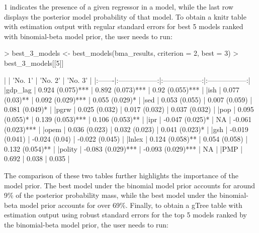 \documentclass[a4paper]{article}
\begin{document}
1 indicates the presence of a given regressor in a model, while the last row displays the posterior model probability of that model. To obtain a knitr table with estimation output with regular standard errors for best 5 models ranked with binomial-beta model prior, the user needs to run:
\begin{Schunk}
\begin{Sinput}
> best_3_models <- best_models(bma_results, criterion = 2, best = 3)
> best_3_models[[5]]
\end{Sinput}
\begin{Soutput}
|        |      'No. 1'      |      'No. 2'      |      'No. 3'      |
|:-------|:-----------------:|:-----------------:|:-----------------:|
|gdp_lag | 0.924 (0.075)***  | 0.892 (0.073)***  |  0.92 (0.055)***  |
|ish     |  0.077 (0.03)**   | 0.092 (0.029)***  |  0.055 (0.029)*   |
|sed     |   0.053 (0.055)   |   0.007 (0.059)   |  0.081 (0.049)*   |
|pgrw    |   0.025 (0.032)   |   0.017 (0.032)   |   0.037 (0.032)   |
|pop     |  0.095 (0.055)*   | 0.139 (0.053)***  |  0.106 (0.053)**  |
|ipr     |  -0.047 (0.025)*  |        NA         | -0.061 (0.023)*** |
|opem    |   0.036 (0.023)   |   0.032 (0.023)   |  0.041 (0.023)*   |
|gsh     |  -0.019 (0.041)   |   -0.024 (0.04)   |  -0.022 (0.045)   |
|lnlex   |  0.124 (0.058)**  |   0.054 (0.058)   |  0.132 (0.054)**  |
|polity  | -0.083 (0.029)*** | -0.093 (0.029)*** |        NA         |
|PMP     |       0.692       |       0.038       |       0.035       |
\end{Soutput}
\end{Schunk}
The comparison of these two tables further highlights the importance of the model prior. The best model under the binomial model prior accounts for around 9\% of the posterior probability mass, while the best model under the binomial-beta model prior accounts for over 69\%. Finally, to obtain a gTree table with estimation output using robust standard errors for the top 5 models ranked by the binomial-beta model prior, the user needs to run:
\end{document}
